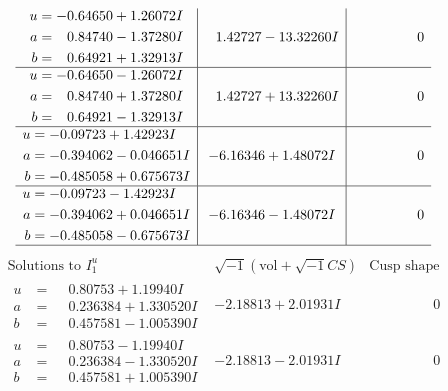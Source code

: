 \documentclass[1p]{elsarticle_modified}
\theoremstyle{definition}
\newcommand{\I}{\sqrt{-1}}
\begin{document}
$$\begin{array}{c|c|c}
\begin{aligned}
u &= -0.64650 + 1.26072 I \\
a &= \phantom{-}0.84740 - 1.37280 I \\
b &= \phantom{-}0.64921 + 1.32913 I\end{aligned}
 & \phantom{-}1.42727 - 13.32260 I & \phantom{-0.000000 } 0 \\ \hline\begin{aligned}
u &= -0.64650 - 1.26072 I \\
a &= \phantom{-}0.84740 + 1.37280 I \\
b &= \phantom{-}0.64921 - 1.32913 I\end{aligned}
 & \phantom{-}1.42727 + 13.32260 I & \phantom{-0.000000 } 0 \\ \hline\begin{aligned}
u &= -0.09723 + 1.42923 I \\
a &= -0.394062 - 0.046651 I \\
b &= -0.485058 + 0.675673 I\end{aligned}
 & -6.16346 + 1.48072 I & \phantom{-0.000000 } 0 \\ \hline\begin{aligned}
u &= -0.09723 - 1.42923 I \\
a &= -0.394062 + 0.046651 I \\
b &= -0.485058 - 0.675673 I\end{aligned}
 & -6.16346 - 1.48072 I & \phantom{-0.000000 } 0\\
 \hline 
 \end{array}$$\newpage$$\begin{array}{c|c|c}  
\text{Solutions to }I^u_{1}& \I (\text{vol} + \sqrt{-1}CS) & \text{Cusp shape}\\
 \hline 
\begin{aligned}
u &= \phantom{-}0.80753 + 1.19940 I \\
a &= \phantom{-}0.236384 + 1.330520 I \\
b &= \phantom{-}0.457581 - 1.005390 I\end{aligned}
 & -2.18813 + 2.01931 I & \phantom{-0.000000 } 0 \\ \hline\begin{aligned}
u &= \phantom{-}0.80753 - 1.19940 I \\
a &= \phantom{-}0.236384 - 1.330520 I \\
b &= \phantom{-}0.457581 + 1.005390 I\end{aligned}
 & -2.18813 - 2.01931 I & \phantom{-0.000000 } 0 \\ \hline\begin{aligned}

\end{aligned}
\end{array}$$
\end{document}
